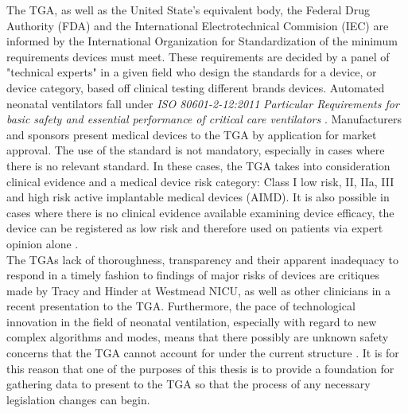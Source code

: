 \documentclass[12pt, openany, oneside]{book}
\begin{document}
The TGA, as well as the United State's equivalent body, the Federal Drug Authority (FDA) and the International Electrotechnical Commision (IEC) are informed by the International Organization for Standardization of the minimum requirements devices must meet. These requirements are decided by a panel of  "technical experts" in a given field who design the standards for a device, or device category, based off clinical testing different brands devices. Automated neonatal ventilators fall under \textit{ISO 80601-2-12:2011} \textit{Particular Requirements for basic safety and essential performance of critical care ventilators} \cite{iso}. Manufacturers and sponsors present medical devices to the TGA by application for market approval. The use of the standard is not mandatory,  especially in cases where there is no relevant standard. In these cases, the TGA takes into consideration clinical evidence and a medical device risk category: Class I low risk, II, IIa, III and high risk active implantable medical devices (AIMD). It is also possible in cases where there is no clinical evidence available examining device efficacy, the device can be registered as low risk and therefore used on patients via expert opinion alone \cite{muzza}. \\

The TGAs lack of thoroughness, transparency and their apparent inadequacy to respond in a timely fashion to findings of major risks of devices are critiques made by Tracy and Hinder at Westmead NICU, as well as other clinicians in a recent presentation to the TGA. Furthermore, the pace of technological innovation in the field of neonatal ventilation, especially with regard to new complex algorithms and modes, means that there possibly are unknown safety concerns that the TGA cannot account for under the current structure \cite{muzza}.  It is for this reason that one of the purposes of this thesis is to provide a foundation for gathering data to present to the TGA so that the process of any necessary legislation changes can begin. \\
\end{document}
